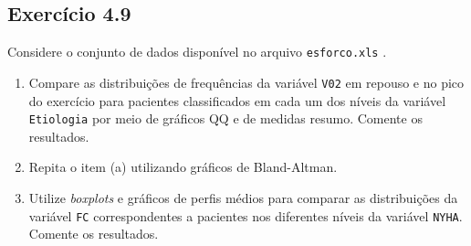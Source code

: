 \documentclass[
]{latex/krantz}
\providecommand{\tightlist}{%
  \setlength{\itemsep}{0pt}\setlength{\parskip}{0pt}}
\theoremstyle{definition}
\theoremstyle{definition}
\theoremstyle{definition}
\theoremstyle{definition}
\theoremstyle{remark}
\begin{document}
\hypertarget{exr4-9}{%
\subsection*{Exercício 4.9}\label{exr4-9}}

Considere o conjunto de dados disponível no arquivo \texttt{esforco.xls} \citep{Braga1996}.

\begin{enumerate}
\def\labelenumi{\alph{enumi}.}
\tightlist
\item
  Compare as distribuições de frequências da variável \texttt{V02} em repouso e no pico do exercício para pacientes classificados em cada um dos níveis da variável \texttt{Etiologia} por meio de gráficos QQ e de medidas resumo. Comente os resultados.
\item
  Repita o item (a) utilizando gráficos de Bland-Altman.
\item
  Utilize \emph{boxplots} e gráficos de perfis médios para comparar as distribuições da variável \texttt{FC} correspondentes a pacientes nos diferentes níveis da variável \texttt{NYHA}. Comente os resultados.
\end{enumerate}
\end{document}
